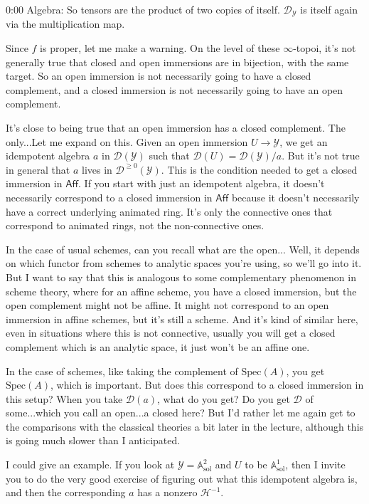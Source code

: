 \begin{unfinished}{0:00}
Algebra: So tensors are the product of two copies of itself. $\mathcal{D}_{\mathscr{Y}}$ is itself again via the multiplication map.

Since $f$ is proper, let me make a warning. On the level of these $\infty$-topoi, it's not generally true that closed and open immersions are in bijection, with the same target. So an open immersion is not necessarily going to have a closed complement, and a closed immersion is not necessarily going to have an open complement.

It's close to being true that an open immersion has a closed complement. The only...Let me expand on this. Given an open immersion $U \to \mathscr{Y}$, we get an idempotent algebra $a$ in $\mathcal{D}(\mathscr{Y})$ such that $\mathcal{D}(U) = \mathcal{D}(\mathscr{Y}) / a$. But it's not true in general that $a$ lives in $\mathcal{D}^{\geq 0}(\mathscr{Y})$. This is the condition needed to get a closed immersion in $\mathsf{Aff}$. If you start with just an idempotent algebra, it doesn't necessarily correspond to a closed immersion in $\mathsf{Aff}$ because it doesn't necessarily have a correct underlying animated ring. It's only the connective ones that correspond to animated rings, not the non-connective ones.

In the case of usual schemes, can you recall what are the open... Well, it depends on which functor from schemes to analytic spaces you're using, so we'll go into it. But I want to say that this is analogous to some complementary phenomenon in scheme theory, where for an affine scheme, you have a closed immersion, but the open complement might not be affine. It might not correspond to an open immersion in affine schemes, but it's still a scheme. And it's kind of similar here, even in situations where this is not connective, usually you will get a closed complement which is an analytic space, it just won't be an affine one.

In the case of schemes, like taking the complement of $\mathrm{Spec}(A)$, you get $\mathrm{Spec}(A)$, which is important. But does this correspond to a closed immersion in this setup? When you take $\mathcal{D}(a)$, what do you get? Do you get $\mathcal{D}$ of some...which you call an open...a closed here? But I'd rather let me again get to the comparisons with the classical theories a bit later in the lecture, although this is going much slower than I anticipated.

I could give an example. If you look at $\mathscr{Y} = \mathbb{A}^2_{\mathrm{sol}}$ and $U$ to be $\mathbb{A}^1_{\mathrm{sol}}$, then I invite you to do the very good exercise of figuring out what this idempotent algebra is, and then the corresponding $a$ has a nonzero $\mathcal{H}^{-1}$.


\end{unfinished}
